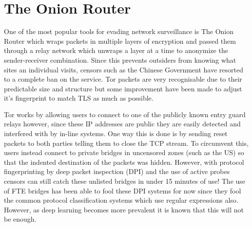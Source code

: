 \documentclass[12pt,a4paper]{article}
\begin{document}
\section{The Onion Router}

One of the most popular tools for evading network surveillance is The Onion Router which wraps packets in multiple layers of encryption and passed them through a relay network which unwraps a layer at a time to anonymize the sender-receiver combination. Since this prevents outsiders from knowing what sites an individual visits, censors such as the Chinese Government have resorted to a complete ban on the service. Tor packets are very recognisable due to their predictable size and structure but some improvement have been made to adjust it's fingerprint to match TLS as much as possible. 

Tor works by allowing users to connect to one of the publicly known entry guard relays however, since these IP addresses are public they are easily detected and interfered with by in-line systems. One way this is done is by sending reset packets to both parties telling them to close the TCP stream.
To circumvent this, users instead connect to private bridges in uncensored zones (such as the US) so that the indented destination of the packets was hidden. However, with protocol fingerprinting by deep packet inspection (DPI) and the use of active probes censors can still catch these unlisted bridges in under 15 minutes of use!
The use of FTE bridges has been able to fool these DPI systems for now since they fool the common protocol classification systems which use regular expressions also. However, as deep learning becomes more prevalent it is known that this will not be enough.

\pagebreak

{}

\end{document}
